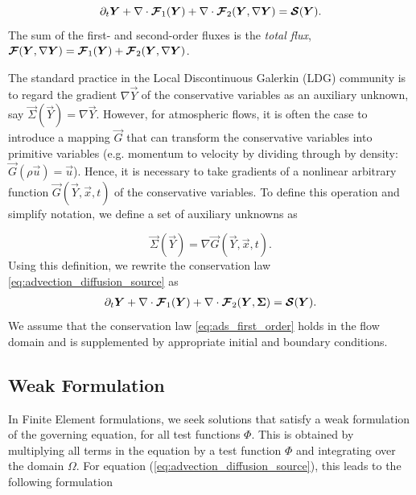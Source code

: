 \documentclass{report}
\numberwithin{equation}{section}
\begin{document}
\begin{equation}\label{eq:advection_diffusion_source}
    \partial_t \boldsymbol{{Y}} 
    + \nabla \cdot \boldsymbol{{\mathcal{F}}}_1 (\boldsymbol{{Y}}) 
    + \nabla \cdot \boldsymbol{{\mathcal{F}}}_2 (\boldsymbol{{Y}}, \nabla \boldsymbol{{Y}}) 
    = \boldsymbol{{\mathcal{S}}}(\boldsymbol{{Y}}).
\end{equation}
The sum of the first- and second-order fluxes is the \emph{total flux}, $\boldsymbol{{\mathcal{F}}}(\boldsymbol{{Y}}, \nabla \boldsymbol{{Y}}) = \boldsymbol{{\mathcal{F}}}_1(\boldsymbol{{Y}}) + \boldsymbol{{\mathcal{F}}}_2(\boldsymbol{{Y}}, \nabla \boldsymbol{{Y}})$.

The standard practice in the Local Discontinuous Galerkin (LDG) community is to regard the gradient $\nabla \vec Y$ of the conservative variables as an auxiliary unknown, say $\vec \Sigma (\vec Y) = \nabla \vec Y$. However, for atmospheric flows, it is often the case to introduce a mapping $\vec{G}$ that can transform the conservative variables into
primitive variables (e.g. momentum to velocity by dividing through by density:
$\vec{G}(\rho \vec{u}) = \vec{u}$). Hence, it is necessary to take gradients of a nonlinear arbitrary function $\vec{G}(\vec Y, \vec x, t)$ of the conservative variables. To define this operation and simplify notation, we define a set of auxiliary unknowns as

\begin{equation}
    \vec \Sigma (\vec Y) = \nabla \vec G (\vec Y, \vec x, t).
    \label{eq:auxiliary}
\end{equation}
Using this definition, we rewrite the conservation law \eqref{eq:advection_diffusion_source} as
\begin{align}
    \partial_t \boldsymbol{{Y}} 
    + \nabla \cdot \boldsymbol{{\mathcal{F}}}_1 (\boldsymbol{{Y}}) 
    + \nabla \cdot \boldsymbol{{\mathcal{F}}}_2 (\boldsymbol{{Y}}, \boldsymbol{{\Sigma}}) 
    = \boldsymbol{{\mathcal{S}}}(\boldsymbol{{Y}}).
    \label{eq:ads_first_order}
\end{align}
We assume that the conservation law \eqref{eq:ads_first_order} holds in the flow domain and is supplemented by appropriate initial and boundary conditions. 

\subsection{Weak Formulation}

In Finite Element formulations, we seek solutions that satisfy a weak formulation of the governing equation, for all test functions $\Phi$. This is obtained by multiplying all terms in the equation by a test function $\Phi$ and integrating over the domain $\Omega$. For equation (\ref{eq:advection_diffusion_source}), this leads to the following formulation
\end{document}
